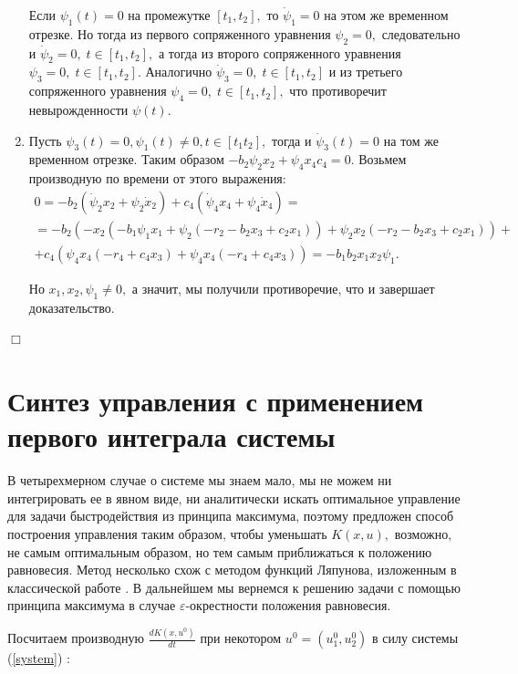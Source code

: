 \documentclass[11pt]{article}
\theoremstyle{definition}
\newenvironment{Proof}
{\par\noindent{\bf Доказательство.\\}} 
{\begin{flushright}$\Box$\end{flushright}}
\newcommand\Ref[1]{(\ref{#1})}
\newcommand\RS{\Ref{system} }
\begin{document}
\begin{Proof}
\begin{enumerate}
        Если $\psi_1(t) = 0$ на промежутке $[t_1, t_2],$ то $\dot \psi_1 = 0$ на этом же временном отрезке. Но тогда из первого сопряженного уравнения $\psi_2 = 0,$ следовательно и $\dot \psi_2 = 0, \;  t \in [t_1, t_2],$ а тогда из второго сопряженного уравнения $\psi_3 = 0, \;  t \in [t_1, t_2].$ Аналогично $\dot \psi_3 = 0, \;  t \in [t_1, t_2]$ и из третьего сопряженного уравнения $\psi_4 = 0, \;  t \in [t_1, t_2],$ что противоречит невырожденности $\psi(t).$
        
    \item
    	Пусть $\psi_3(t) = 0, \psi_1(t) \ne 0, t \in [t_1 t_2],$ тогда и $\dot \psi_3(t) = 0$ на том же временном отрезке. Таким образом $-b_2\psi_2x_2 + \psi_4x_4c_4 = 0.$ Возьмем производную по времени от этого выражения:
    	\begin{multline*}
    		0 = -b_2(\dot \psi_2x_2 + \psi_2 \dot x_2) + c_4(\dot \psi_4 x_4 + \psi_4 \dot x_4) = \\
    		= -b_2(-x_2(-b_1\psi_1x_1 + \psi_2(-r_2 - b_2x_3 + c_2x_1)) + \psi_2 x_2(-r_2 - b_2x_3 + c_2x_1)) + \\
    		+ c_4(\psi_4x_4(-r_4 + c_4x_3) + \psi_4x_4(-r_4 + c_4x_3)) = -b_1b_2x_1x_2\psi_1.
    	\end{multline*}
    	
    	Но $x_1, x_2, \psi_1 \ne 0,$ а значит, мы получили противоречие, что и завершает доказательство.
    
    \end{enumerate}    
\end{Proof}

\section{Синтез управления с применением первого интеграла системы}

	\indent В четырехмерном случае о системе мы знаем мало, мы не можем ни интегрировать ее в явном виде, ни аналитически искать оптимальное управление для задачи быстродействия из принципа максимума, поэтому предложен способ построения управления таким образом, чтобы уменьшать $K(x,u),$ возможно, не самым оптимальным образом, но тем самым приближаться к положению равновесия. Метод несколько схож с методом функций Ляпунова, изложенным в классической работе \cite{Lyapunov}. В дальнейшем мы вернемся к решению задачи с помощью принципа максимума в случае $\varepsilon$-окрестности положения равновесия.

Посчитаем производную $\frac{dK(x,u^0)}{dt}$ при некотором $u^0 = (u_1^0, u_2^0)$ в силу системы \RS:
\end{document}
